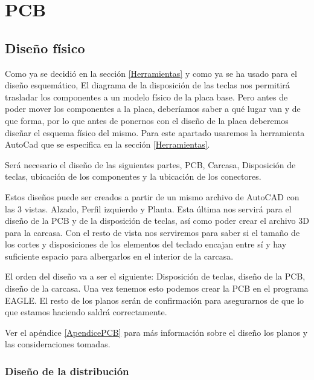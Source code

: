 \chapter{PCB}

\section{Diseño físico} \label{DiseñoFisico}

Como ya se decidió en la sección \ref{Herramientas} y como ya se ha usado para el diseño esquemático, El diagrama de la disposición de las teclas nos permitirá trasladar los componentes a un modelo físico de la placa base. Pero antes de poder mover los componentes a la placa, deberíamos saber a qué lugar van y de que forma, por lo que antes de ponernos con el diseño de la placa deberemos diseñar el esquema físico del mismo. Para este apartado usaremos la herramienta AutoCad que se especifica en la sección \ref{Herramientas}.

Será necesario el diseño de las siguientes partes, \gls{PCB}, Carcasa, Disposición de teclas, ubicación de los componentes y la ubicación de los conectores.

Estos diseños puede ser creados a partir de un mismo archivo de AutoCAD con las 3 vistas. Alzado, Perfil izquierdo y Planta. Esta última nos servirá para el diseño de la \gls{PCB} y de la disposición de teclas, así como poder crear el archivo 3D para la carcasa. Con el resto de vista nos serviremos para saber si el tamaño de los cortes y disposiciones de los elementos del teclado encajan entre sí y hay suficiente espacio para albergarlos en el interior de la carcasa.

El orden del diseño va a ser el siguiente: Disposición de teclas, diseño de la \gls{PCB}, diseño de la carcasa. Una vez tenemos esto podemos crear la \gls{PCB} en el programa EAGLE. El resto de los planos serán de confirmación para asegurarnos de que lo que estamos haciendo saldrá correctamente.

\begin{tcolorbox}[colback=blue!5!white, colframe=blue!55!white, title=Nota]
    Ver el apéndice \ref{ApendicePCB} para más información sobre el diseño los planos y las consideraciones tomadas. 
\end{tcolorbox}

\newpage
\subsection{Diseño de la distribución} \label{CreacionPlanoDistribucion}

